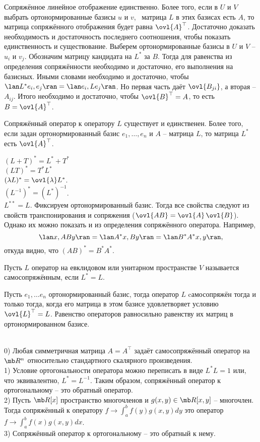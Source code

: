 \thrm Сопряжённое линейное отображение единственно. Более того, если в $U$ и $V$ выбрать ортонормированные базисы $u$ и $v$, \ матрица $L$ в этих базисах есть $A$, то матрица сопряжённого отображения будет равна $\ovl{A}^{\top}$.
\proof Достаточно доказать необходимость и достаточность последнего соотношения, чтобы показать единственность и существование. Выберем ортонормированные базисы в $U$ и $V$ -- $u_i$ и $v_j$. Обозначим матрицу кандидата на $L^*$ за $B$. Тогда для равенства из определения сопряжённости необходимо и достаточно, его выполнения на базисных. Иными словами необходимо и достаточно, чтобы $\lan L^*e_i,e_j\ran=\lan e_i,Le_j\ran$. Но первая часть даёт $\ovl{B_{ji}}$, а вторая -- $A_{ij}$. Итого необходимо и достаточно, чтобы $\ovl{B}^\top=A$, то есть $B=\ovl{A}^\top$.   
\endproof
\ethrm



\crl Сопряжённый оператор к оператору $L$ существует и единственен. Более того, если задан ортонормированный базис $e_1,\dots,e_n$ и $A$ -- матрица $L$, то матрица $L^*$ есть $\ovl{A}^{\top}$.
\ecrl









$(L+T)^*=L^*+T^*$\\
$(LT)^*=T^*L^*$\\
$(\lambda L)^*=\ovl{\lambda}L^*$.\\
$(L^{-1})^*=(L^*)^{-1}$.\\
$L^{**}=L$.
\proof Фиксируем ортонормированный базис. Тогда все свойства следуют из свойств транспонирования и сопряжения ($\ovl{AB} = \ovl{ A} \,\ovl{B}$).
Однако их можно показать и из определения сопряжённого оператора. Например,
$$\lan x, ABy\ran = \lan A^*x, By\ran = \lan B^*A^*x,y\ran,$$
откуда видно, что $(AB)^*=B^* A^*$. 
\endproof
\elm




\dfn Пусть $L$ оператор на евклидовом или унитарном пространстве $V$ называется самосопряжённым, если $L^*=L$.
\edfn


\rm Пусть $e_1,\dots e_n$ ортонормированный базис, тогда оператор $L$ cамосопряжён тогда и только тогда, когда его матрица в этом базисе удовлетворяет условию $\ovl{L}^{\top}=L$.
\proof Равенство операторов равносильно равенству их матриц в ортонормированном базисе.
\endproof
\erm



\exm\\
0) Любая симметричная матрица $A=A^{\top}$ задаёт самосопряжённый оператор на $\mb R^n$ относительно стандартного скалярного произведения.\\
1) Условие ортогональности оператора можно переписать в виде $L^*L=1$ или, что эквивалентно, $L^*=L^{-1}$. Таким образом, сопряжённый оператор к ортогональному -- это обратный оператор.\\
2) Пусть $\mb R[x]$ пространство многочленов и $g(x,y) \in \mb R[x,y]$ -- многочлен. Тогда сопряжённый к оператору $f \to \int_{a}^b f(y)g(x,y)dy$ это оператор $f\to\int_{a}^b f(x)g(x,y)dx$.\\
3) Сопряжённый оператор к ортогональному -- это обратный к нему.




